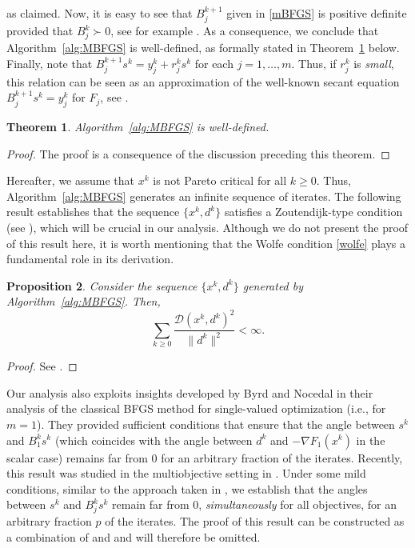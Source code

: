 \documentclass[11pt]{article}
\newtheorem{theorem}{Theorem}[section]
\newtheorem{proposition}[theorem]{Proposition}
\numberwithin{assumption}{section}
\newcommand{\D}{\mathcal{D}}
\begin{document}
as claimed.  Now, it is easy to see that $B_j^{k+1}$ given in \eqref{mBFGS} is positive definite provided that $B_j^{k} \succ 0$, see for example \cite[Section~6.1]{NoceWrig06}.
As a consequence, we conclude that Algorithm~\ref{alg:MBFGS} is well-defined, as formally stated in Theorem~\ref{teo:well} below.
Finally, note that $B_j^{k+1}s^k= y_j^k + r_j^ks^k$ for each $j=1,\ldots,m$. Thus, if $r_j^k$ is {\it small}, this relation can be seen as an approximation of the well-known secant equation $B_j^{k+1}s^k= y_j^k$ for $F_j$, see \cite{Li-Fu-MBFGS}.

\begin{theorem} \label{teo:well}
Algorithm~\ref{alg:MBFGS} is well-defined.
\end{theorem}
\begin{proof}
The proof is a consequence of the discussion preceding this theorem.
\end{proof}

Hereafter, we assume that $x^k$ is not Pareto critical for all $k\geq 0$. 
Thus, Algorithm~\ref{alg:MBFGS} generates an infinite sequence of iterates.
The following result establishes that the sequence $\{x^k,d^k\}$ satisfies a Zoutendijk-type condition (see \cite{cgvo}), which will be crucial in our analysis.
Although we do not present the proof of this result here, it is worth mentioning that the Wolfe condition \eqref{wolfe} plays a fundamental role in its derivation.

\begin{proposition}\label{prop:zout}
Consider the sequence $\{x^k,d^k\}$ generated by Algorithm~\ref{alg:MBFGS}. Then,
\begin{equation}\label{Zout}
	\sum_{k\geq 0} \dfrac{\D(x^k,d^k)^2}{\|d^k\|^2} < \infty.
\end{equation}
\end{proposition}
\begin{proof}
See \cite[Proposition~3.3]{cgvo}.
\end{proof}

Our analysis also exploits insights developed by Byrd and Nocedal  \cite{Tool} in their analysis of the classical BFGS method for single-valued optimization (i.e., for $m=1$).
They provided sufficient conditions that ensure that the angle between $s^k$ and $B_1^ks^k$ (which coincides with the angle between $d^k$ and $-\nabla F_1(x^k)$ in the scalar case)  remains far from $0$ for an arbitrary fraction of the iterates.
Recently, this result was studied in the multiobjective setting in \cite{Leandro&Danilo}.
Under some mild conditions, similar to the approach taken in \cite{Leandro&Danilo}, we establish that the angles between $s^k$ and $B_j^ks^k$ remain far from $0$, {\it simultaneously} for all objectives, for an arbitrary fraction $p$ of the iterates.
The proof of this result can be constructed as a combination of \cite[Theorem~2.1]{Tool} and \cite[Lemma~4.2]{Leandro&Danilo} and will therefore be omitted.
\end{document}
